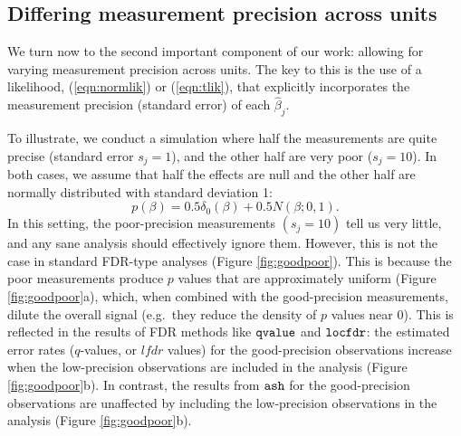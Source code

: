 \documentclass[11pt]{article}
\def\lfdr{\textit{lfdr}}
\def\bhat{\hat{\beta}}
\def\qvalue{{\tt qvalue}\xspace}
\def\locfdr{{\tt locfdr}\xspace}
\def\ash{{\tt ash}\xspace}
\begin{document}
\subsection*{Differing measurement precision across units}

 We turn now to the second important component of our work: allowing for varying
 measurement precision across units. The key to this is the use of a likelihood,
 (\ref{eqn:normlik}) or (\ref{eqn:tlik}), that explicitly incorporates the measurement precision (standard error) of each $\bhat_j$.
 
  To illustrate, we conduct a simulation where half the measurements are quite precise (standard error $s_j = 1$), and the other half are very poor
 ($s_j=10$).  In both cases,
we assume that half the effects are null
and the other half are normally distributed with standard deviation 1:
\begin{equation}
p(\beta) = 0.5 \delta_0(\beta) + 0.5 N(\beta; 0,1).
\end{equation}
In this setting, the poor-precision measurements $(s_j=10)$ tell us very little, and any sane analysis should effectively ignore them. 
 However, this is not the case in standard FDR-type analyses (Figure \ref{fig:goodpoor}). This is because the poor measurements 
 produce $p$ values that are approximately uniform  (Figure \ref{fig:goodpoor}a), 
 which, when combined with the good-precision measurements, dilute the overall signal 
 (e.g.~they reduce the density of $p$ values near 0).
 This is reflected in the results of FDR methods like $\qvalue$ and $\locfdr$:
the estimated error rates ($q$-values, or $\lfdr$ values) for the good-precision observations increase when the low-precision observations are included in the analysis
(Figure \ref{fig:goodpoor}b). In contrast, the results from $\ash$ 
for the good-precision observations are unaffected by including the low-precision observations in the analysis (Figure \ref{fig:goodpoor}b).
\end{document}
